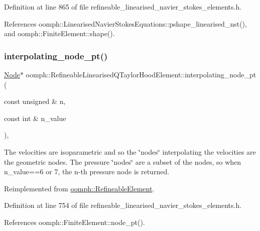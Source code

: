 Definition at line 865 of file refineable\+\_\+linearised\+\_\+navier\+\_\+stokes\+\_\+elements.\+h.



References oomph\+::\+Linearised\+Navier\+Stokes\+Equations\+::pshape\+\_\+linearised\+\_\+nst(), and oomph\+::\+Finite\+Element\+::shape().

\mbox{\label{classoomph_1_1RefineableLinearisedQTaylorHoodElement_a85ac5379a96e6ca0cbe712218e494962}} 
\subsubsection{\texorpdfstring{interpolating\+\_\+node\+\_\+pt()}{interpolating\_node\_pt()}}
{\footnotesize\ttfamily \hyperlink{classoomph_1_1Node}{Node}$\ast$ oomph\+::\+Refineable\+Linearised\+Q\+Taylor\+Hood\+Element\+::interpolating\+\_\+node\+\_\+pt (\begin{DoxyParamCaption}\item[{const unsigned \&}]{n,  }\item[{const int \&}]{n\+\_\+value }\end{DoxyParamCaption})\hspace{0.3cm}{\ttfamily [inline]}, {\ttfamily [virtual]}}



The velocities are isoparametric and so the \char`\"{}nodes\char`\"{} interpolating the velocities are the geometric nodes. The pressure \char`\"{}nodes\char`\"{} are a subset of the nodes, so when n\+\_\+value==6 or 7, the n-\/th pressure node is returned. 



Reimplemented from \hyperlink{classoomph_1_1RefineableElement_ab27986fc2f6033a4758662cde78a7b76}{oomph\+::\+Refineable\+Element}.



Definition at line 754 of file refineable\+\_\+linearised\+\_\+navier\+\_\+stokes\+\_\+elements.\+h.



References oomph\+::\+Finite\+Element\+::node\+\_\+pt().


